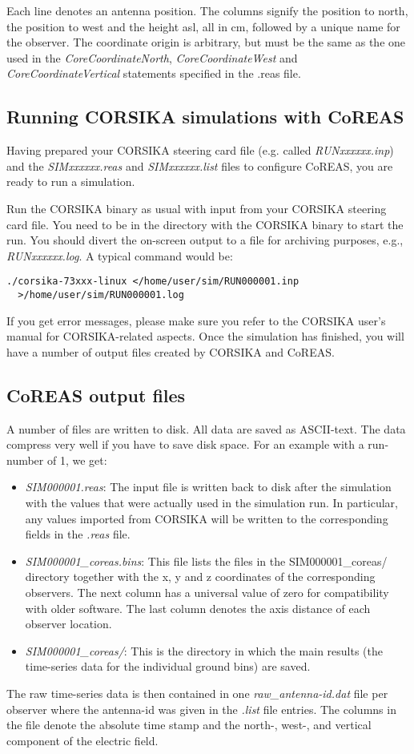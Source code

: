 \documentclass[a4paper,10pt]{article}
\begin{document}
Each line denotes an antenna position. The columns signify the position to north, the position to west and the height asl, all in cm, followed by a unique name for the observer. The coordinate origin is arbitrary, but must be the same as the one used in the {\it CoreCoordinateNorth}, {\it CoreCoordinateWest} and {\it CoreCoordinateVertical} statements specified in the .reas file.

\subsection{Running CORSIKA simulations with CoREAS} \label{sec:corsikafiles}

Having prepared your CORSIKA steering card file (e.g. called {\it RUNxxxxxx.inp}) and the {\it SIMxxxxxx.reas} and {\it SIMxxxxxx.list} files to configure CoREAS, you are ready to run a simulation.

Run the CORSIKA binary as usual with input from your CORSIKA steering card file. You need to be in the directory with the CORSIKA binary to start the run. You should divert the on-screen output to a file for archiving purposes, e.g., {\it RUNxxxxxx.log}. A typical command would be:
%
\begin{verbatim}
./corsika-73xxx-linux </home/user/sim/RUN000001.inp
  >/home/user/sim/RUN000001.log
\end{verbatim}
%
If you get error messages, please make sure you refer to the CORSIKA user's manual for CORSIKA-related aspects. Once the simulation has finished, you will have a number of output files created by CORSIKA and CoREAS.

\subsection{CoREAS output files}

A number of files are written to disk. All data are saved as ASCII-text. The data compress very well if you have to save disk space. For an example with a run-number of 1, we get:
%
\begin{itemize}
\item{{\it SIM000001.reas}: The input file is written back to disk after the simulation with the values that were actually used in the simulation run. In particular, any values imported from CORSIKA will be written to the corresponding fields in the {\it .reas} file.}
\item{{\it SIM000001\_coreas.bins}: This file lists the files in the SIM000001\_coreas/ directory together with the x, y and z coordinates of the corresponding observers. The next column has a universal value of zero for compatibility with older software. The last column denotes the axis distance of each observer location.}
\item{{\it SIM000001\_coreas/}: This is the directory in which the main results (the time-series data for the individual ground bins) are saved.}
\end{itemize}
%
The raw time-series data is then contained in one {\it raw\_antenna-id.dat} file per observer where the antenna-id was given in the {\it .list} file entries. The columns in the file denote the absolute time stamp and the north-, west-, and vertical component of the electric field.  
\end{document}
